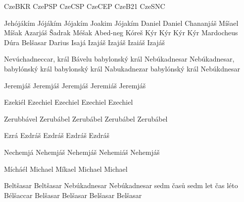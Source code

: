 
 {CzeBKR} {CzePSP} {CzeCSP} {CzeCEP} {CzeB21} {CzeSNC}

 {Jehójákím} {Jójákím} {Jójakím} {Joakim} {Jójakím}
 {} {Daniel} {Daniel} {} {}
 {} {} {Chananjáš} {} {}
 {} {} {Míšael} {} {}  %
 {} {} {Míšak} {} {}
 {} {} {Azarjáš} {} {}
 {} {} {Šadrak} {} {}
 {} {} {Méšak} {} {}
 {} {} {Abed-neg} {} {} %
 {Kóreš} {Kýr} {Kýr} {Kýr} {Kýr}
 {} {} {Mardocheus} {} {}  %
 {} {} {Dúra} {} {} 
 {} {} {Belšasar} {} {}
 {} {} {Darius} {} {} %
 {Isajá} {Izajáš} {Izajáš} {Izaiáš} {Izajáš}

       {Nevúchadneccar, král Bávelu}
       {babylonský král Nebúkadnesar}
       {Nebúkadnesar, babylónský král}
       {babylonský král Nabukadnezar}                  
       {babylónský král Nebúkdnesar}                        

        {Jeremjáš} %
        {Jeremjáš} %
        {Jeremjáš} %
        {Jeremiáš} %
        {Jeremjáš} %

       {Ezekiél} %
       {Ezechiel} %
       {Ezechiel} %
       {Ezechiel} %
       {Ezechiel} %


       {Zerubbável} %
       {Zerubábel} %
       {Zerubábel} %
       {Zerubábel} %
       {Zerubábel} %

       {Ezrá} %
       {Ezdráš} %
       {Ezdráš} %
       {Ezdráš} %
       {Ezdráš} %

       {Nechemjá} %
       {Nehemjáš} %
       {Nehemjáš} %
       {Nehemiáš} %
       {Nehemjáš} %

       {Mícháél} %
       {Michael} %
       {Míkael} %
       {Michael} %
       {Michael} %





       {}  {Beltšasar}    {Beltšasar}    {} {}
 {}  {Nebúkadnesar} {Nebúkadnesar} {} {}
       {}  {sedm časů}    {sedm let}     {} {}
           {}  {čas}          {léto}         {} {}
  {Bélšaccar} {Belšasar}   {Belšasar}  {Belšasar}  {Belšasar}


